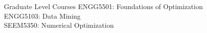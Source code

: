 \begin{rSection}{Graduate Level Courses}
    ENGG5501: Foundations of Optimization \\ 
    ENGG5103: Data Mining \\
    SEEM5350: Numerical Optimization
\end{rSection}

